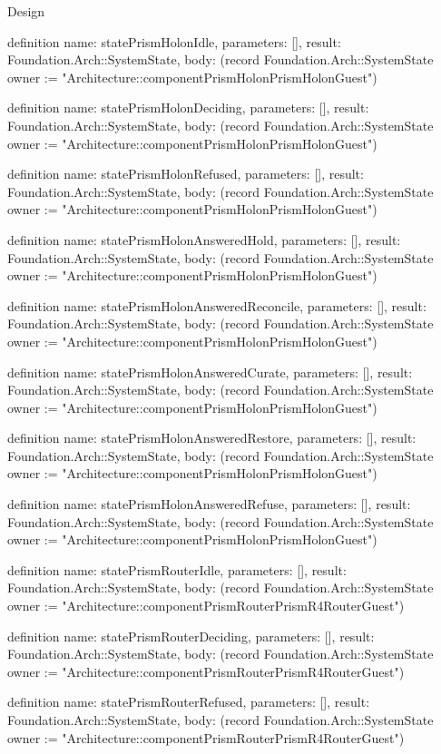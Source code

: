 \begin{lexlean}{Design}
\begin{semanticmodule}
definition{
  name: statePrismHolonIdle,
  parameters: [],
  result: Foundation.Arch::SystemState,
  body: (record Foundation.Arch::SystemState {owner := "Architecture::componentPrismHolonPrismHolonGuest"})
}

definition{
  name: statePrismHolonDeciding,
  parameters: [],
  result: Foundation.Arch::SystemState,
  body: (record Foundation.Arch::SystemState {owner := "Architecture::componentPrismHolonPrismHolonGuest"})
}

definition{
  name: statePrismHolonRefused,
  parameters: [],
  result: Foundation.Arch::SystemState,
  body: (record Foundation.Arch::SystemState {owner := "Architecture::componentPrismHolonPrismHolonGuest"})
}

definition{
  name: statePrismHolonAnsweredHold,
  parameters: [],
  result: Foundation.Arch::SystemState,
  body: (record Foundation.Arch::SystemState {owner := "Architecture::componentPrismHolonPrismHolonGuest"})
}

definition{
  name: statePrismHolonAnsweredReconcile,
  parameters: [],
  result: Foundation.Arch::SystemState,
  body: (record Foundation.Arch::SystemState {owner := "Architecture::componentPrismHolonPrismHolonGuest"})
}

definition{
  name: statePrismHolonAnsweredCurate,
  parameters: [],
  result: Foundation.Arch::SystemState,
  body: (record Foundation.Arch::SystemState {owner := "Architecture::componentPrismHolonPrismHolonGuest"})
}

definition{
  name: statePrismHolonAnsweredRestore,
  parameters: [],
  result: Foundation.Arch::SystemState,
  body: (record Foundation.Arch::SystemState {owner := "Architecture::componentPrismHolonPrismHolonGuest"})
}

definition{
  name: statePrismHolonAnsweredRefuse,
  parameters: [],
  result: Foundation.Arch::SystemState,
  body: (record Foundation.Arch::SystemState {owner := "Architecture::componentPrismHolonPrismHolonGuest"})
}

definition{
  name: statePrismRouterIdle,
  parameters: [],
  result: Foundation.Arch::SystemState,
  body: (record Foundation.Arch::SystemState {owner := "Architecture::componentPrismRouterPrismR4RouterGuest"})
}

definition{
  name: statePrismRouterDeciding,
  parameters: [],
  result: Foundation.Arch::SystemState,
  body: (record Foundation.Arch::SystemState {owner := "Architecture::componentPrismRouterPrismR4RouterGuest"})
}

definition{
  name: statePrismRouterRefused,
  parameters: [],
  result: Foundation.Arch::SystemState,
  body: (record Foundation.Arch::SystemState {owner := "Architecture::componentPrismRouterPrismR4RouterGuest"})
}


\end{semanticmodule}
\end{lexlean}
